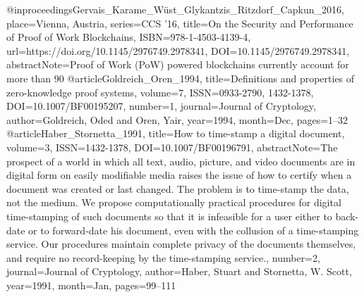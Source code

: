  @inproceedings{Gervais_Karame_Wüst_Glykantzis_Ritzdorf_Capkun_2016, place={Vienna, Austria}, series={CCS ’16}, title={On the Security and Performance of Proof of Work Blockchains}, ISBN={978-1-4503-4139-4}, url={https://doi.org/10.1145/2976749.2978341}, DOI={10.1145/2976749.2978341}, abstractNote={Proof of Work (PoW) powered blockchains currently account for more than 90%
 @article{Goldreich_Oren_1994, title={Definitions and properties of zero-knowledge proof systems}, volume={7}, ISSN={0933-2790, 1432-1378}, DOI={10.1007/BF00195207}, number={1}, journal={Journal of Cryptology}, author={Goldreich, Oded and Oren, Yair}, year={1994}, month={Dec}, pages={1–32} }
 @article{Haber_Stornetta_1991, title={How to time-stamp a digital document}, volume={3}, ISSN={1432-1378}, DOI={10.1007/BF00196791}, abstractNote={The prospect of a world in which all text, audio, picture, and video documents are in digital form on easily modifiable media raises the issue of how to certify when a document was created or last changed. The problem is to time-stamp the data, not the medium. We propose computationally practical procedures for digital time-stamping of such documents so that it is infeasible for a user either to back-date or to forward-date his document, even with the collusion of a time-stamping service. Our procedures maintain complete privacy of the documents themselves, and require no record-keeping by the time-stamping service.}, number={2}, journal={Journal of Cryptology}, author={Haber, Stuart and Stornetta, W. Scott}, year={1991}, month={Jan}, pages={99–111} }
}}
